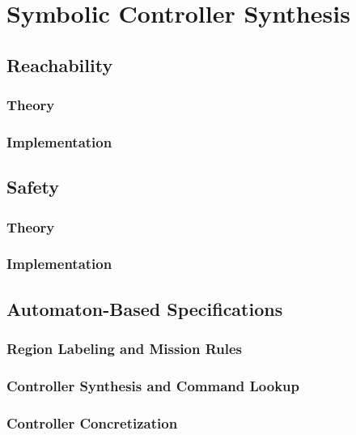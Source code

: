 \documentclass[11pt,a4paper]{article}
\begin{document}
\section{Symbolic Controller Synthesis}
\label{sec:synthesis}

\subsection{Reachability}

\subsubsection{Theory}

\subsubsection{Implementation}

\subsection{Safety}

\subsubsection{Theory}

\subsubsection{Implementation}

\subsection{Automaton-Based Specifications}

\subsubsection{Region Labeling and Mission Rules}

\subsubsection{Controller Synthesis and Command Lookup}

\subsubsection{Controller Concretization}
\end{document}

